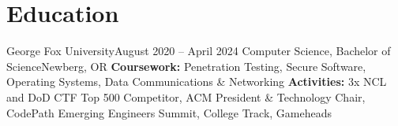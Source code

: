 \section{Education}
  \resumeSubHeadingListStart
    \resumeEducationSubheading
        {George Fox University}{August 2020 -- April 2024}
        {Computer Science, Bachelor of Science}{Newberg, OR}
        {\textbf{Coursework:} Penetration Testing, Secure Software, Operating Systems, Data Communications \& Networking}
        {\textbf{Activities:} 3x NCL and DoD CTF Top 500 Competitor, ACM President \& Technology Chair, CodePath Emerging Engineers Summit, College Track, Gameheads}
  \resumeSubHeadingListEnd


